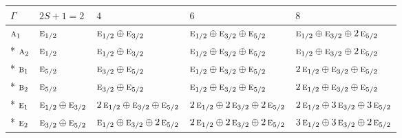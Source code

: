 \documentclass[10pt,a4paper]{article}
\numberwithin{equation}{section}
\newcommand{\irr}[1]{\text{\normalfont\scshape #1}}
\begin{document}
{\small\setlength{\tabcolsep}{3pt}\begin{longtable}{@{}lllll@{}}\toprule
$\Gamma$ & $2S + 1 = 2$ & $4$ & $6$ & $8$\\\midrule\endhead
\bottomrule\endfoot\endlastfoot
$\irr{a}_{1}$ & $\irr{e}_{1/2}$ & $\irr{e}_{1/2}\oplus \irr{e}_{3/2}$ & $\irr{e}_{1/2}\oplus \irr{e}_{3/2}\oplus \irr{e}_{5/2}$ & $\irr{e}_{1/2}\oplus \irr{e}_{3/2}\oplus 2\,\irr{e}_{5/2}$\\*
$\irr{a}_{2}$ & $\irr{e}_{1/2}$ & $\irr{e}_{1/2}\oplus \irr{e}_{3/2}$ & $\irr{e}_{1/2}\oplus \irr{e}_{3/2}\oplus \irr{e}_{5/2}$ & $\irr{e}_{1/2}\oplus \irr{e}_{3/2}\oplus 2\,\irr{e}_{5/2}$\\*
$\irr{b}_{1}$ & $\irr{e}_{5/2}$ & $\irr{e}_{3/2}\oplus \irr{e}_{5/2}$ & $\irr{e}_{1/2}\oplus \irr{e}_{3/2}\oplus \irr{e}_{5/2}$ & $2\,\irr{e}_{1/2}\oplus \irr{e}_{3/2}\oplus \irr{e}_{5/2}$\\*
$\irr{b}_{2}$ & $\irr{e}_{5/2}$ & $\irr{e}_{3/2}\oplus \irr{e}_{5/2}$ & $\irr{e}_{1/2}\oplus \irr{e}_{3/2}\oplus \irr{e}_{5/2}$ & $2\,\irr{e}_{1/2}\oplus \irr{e}_{3/2}\oplus \irr{e}_{5/2}$\\*
$\irr{e}_{1}$ & $\irr{e}_{1/2}\oplus \irr{e}_{3/2}$ & $2\,\irr{e}_{1/2}\oplus \irr{e}_{3/2}\oplus \irr{e}_{5/2}$ & $2\,\irr{e}_{1/2}\oplus 2\,\irr{e}_{3/2}\oplus 2\,\irr{e}_{5/2}$ & $2\,\irr{e}_{1/2}\oplus 3\,\irr{e}_{3/2}\oplus 3\,\irr{e}_{5/2}$\\*
$\irr{e}_{2}$ & $\irr{e}_{3/2}\oplus \irr{e}_{5/2}$ & $\irr{e}_{1/2}\oplus \irr{e}_{3/2}\oplus 2\,\irr{e}_{5/2}$ & $2\,\irr{e}_{1/2}\oplus 2\,\irr{e}_{3/2}\oplus 2\,\irr{e}_{5/2}$ & $3\,\irr{e}_{1/2}\oplus 3\,\irr{e}_{3/2}\oplus 2\,\irr{e}_{5/2}$\\
\bottomrule\end{longtable}}
\end{document}
